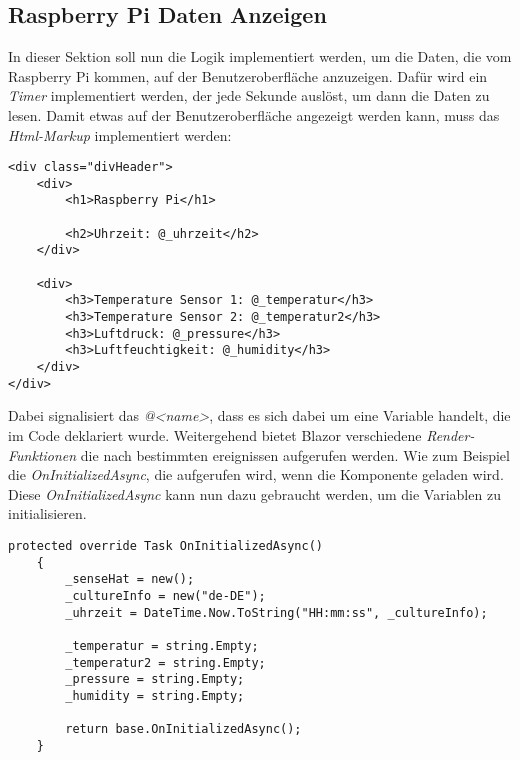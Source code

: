 \subsection{Raspberry Pi Daten Anzeigen}
\label{subsec:DatenAnzeigen}
In dieser Sektion soll nun die Logik implementiert werden, um die Daten, die vom Raspberry Pi
kommen, auf der Benutzeroberfläche anzuzeigen. Dafür wird ein \emph{Timer} implementiert werden, der
jede Sekunde auslöst, um dann die Daten zu lesen.
\newline
\newline
Damit etwas auf der Benutzeroberfläche angezeigt werden kann, muss das \emph{Html-Markup}
implementiert werden:

\begin{lstlisting}[language={[Sharp]C}, caption=Html-Markup,
    label=lst:HtmlMarkup]
<div class="divHeader">
    <div>
        <h1>Raspberry Pi</h1>

        <h2>Uhrzeit: @_uhrzeit</h2>
    </div>

    <div>
        <h3>Temperature Sensor 1: @_temperatur</h3>
        <h3>Temperature Sensor 2: @_temperatur2</h3>
        <h3>Luftdruck: @_pressure</h3>
        <h3>Luftfeuchtigkeit: @_humidity</h3>
    </div>
</div>
\end{lstlisting}

Dabei signalisiert das \emph{@<name>}, dass es sich dabei um eine Variable handelt, die im Code
deklariert wurde.
\newline
\newline
Weitergehend bietet Blazor verschiedene \emph{Render-Funktionen} die nach bestimmten ereignissen
aufgerufen werden. Wie zum Beispiel die \emph{OnInitializedAsync}, die aufgerufen wird, wenn die
Komponente geladen wird. Diese \emph{OnInitializedAsync} kann nun dazu gebraucht werden, um die
Variablen zu initialisieren.

\begin{lstlisting}[language={[Sharp]C}, caption=Render-Funktion: OnInitializedAsync,
    label=lst:OnInitializedAsync]
    protected override Task OnInitializedAsync()
    {
        _senseHat = new();
        _cultureInfo = new("de-DE");
        _uhrzeit = DateTime.Now.ToString("HH:mm:ss", _cultureInfo);

        _temperatur = string.Empty;
        _temperatur2 = string.Empty;
        _pressure = string.Empty;
        _humidity = string.Empty;

        return base.OnInitializedAsync();
    }
\end{lstlisting}

